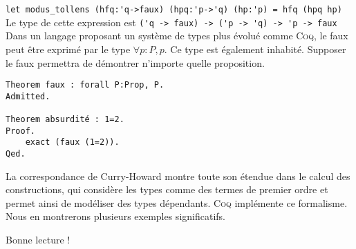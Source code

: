 \documentclass[11pt]{book}
\begin{document}
\verb+let modus_tollens (hfq:'q->faux) (hpq:'p->'q) (hp:'p) = hfq (hpq hp)+  \\
Le type de cette expression est  \verb+('q -> faux) -> ('p -> 'q) -> 'p -> faux+  \\

Dans un langage proposant un système de types plus évolué comme \textsc{Coq}, le faux peut être exprimé 
par le type $\forall p:P, p$. Ce type est également inhabité. Supposer le faux permettra de démontrer 
n'importe quelle proposition.

\begin{Verbatim}
Theorem faux : forall P:Prop, P.
Admitted.

Theorem absurdité : 1=2.
Proof.
    exact (faux (1=2)). 
Qed.
\end{Verbatim}

La correspondance de Curry-Howard montre toute son étendue dans le calcul des constructions, qui 
considère les types comme des termes de premier ordre et permet ainsi de modéliser des types dépendants.
\textsc{Coq} implémente ce formalisme.
Nous en montrerons plusieurs exemples significatifs.

\vspace{0.3cm}
Bonne lecture !

















 
\end{document}
